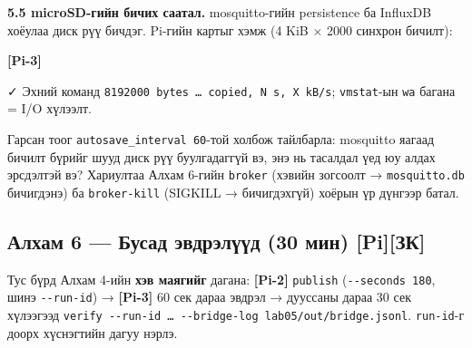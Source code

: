 \textbf{5.5 microSD-гийн бичих саатал.} mosquitto-гийн persistence ба InfluxDB хоёулаа диск рүү бичдэг. Pi-гийн картыг хэмж (4 KiB × 2000 синхрон бичилт):

\textbf{{[}Pi-3{]}}

\begin{Shaded}
\begin{Highlighting}[]
 \KeywordTok{|} 
\KeywordTok{\&\&} 
\end{Highlighting}
\end{Shaded}

✓ Эхний команд \texttt{8192000\ bytes\ \ldots{}\ copied,\ N\ s,\ X\ kB/\allowbreak{}s}; \texttt{vmstat}-ын \texttt{wa} багана = I/O хүлээлт.

Гарсан тоог \texttt{autosave\_\allowbreak{}interval\ 60}-той холбож тайлбарла: mosquitto яагаад бичилт бүрийг шууд диск рүү буулгадаггүй вэ, энэ нь тасалдал үед юу алдах эрсдэлтэй вэ? Хариултаа Алхам 6-гийн \texttt{broker} (хэвийн зогсоолт → \texttt{mosquitto.db} бичигдэнэ) ба \texttt{broker-kill} (SIGKILL → бичигдэхгүй) хоёрын үр дүнгээр батал.

\hypertarget{ux430ux43bux445ux430ux43c-6-ux431ux443ux441ux430ux434-ux44dux432ux434ux440ux44dux43bux4afux4afux434-30-ux43cux438ux43d-piux437ux43a}{%
\subsection{Алхам 6 --- Бусад эвдрэлүүд (30 мин) {[}Pi{]}{[}ЗК{]}}\label{ux430ux43bux445ux430ux43c-6-ux431ux443ux441ux430ux434-ux44dux432ux434ux440ux44dux43bux4afux4afux434-30-ux43cux438ux43d-piux437ux43a}}

Тус бүрд Алхам 4-ийн \textbf{хэв маягийг} дагана: \textbf{{[}Pi-2{]}} \texttt{publish} (\texttt{-\/-seconds\ 180}, шинэ \texttt{-\/-run-id}) → \textbf{{[}Pi-3{]}} 60 сек дараа эвдрэл → дууссаны дараа 30 сек хүлээгээд \texttt{verify\ -\/\allowbreak{}-run-id\ \ldots{}\ -\/\allowbreak{}-bridge-log\ lab05/\allowbreak{}out/\allowbreak{}bridge.\allowbreak{}jsonl}. \texttt{run-id}-г доорх хүснэгтийн дагуу нэрлэ.

